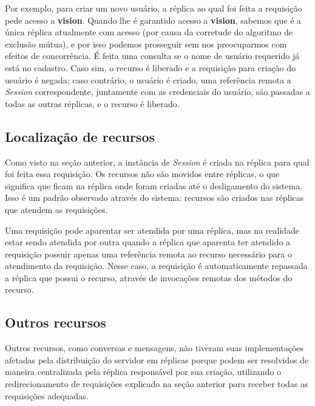 \documentclass[../main.tex]{subfiles}
\begin{document}
Por exemplo, para criar um novo usuário, a réplica ao qual foi feita a requisição pede acesso a \textbf{vision}.
Quando lhe é garantido acesso a \textbf{vision}, sabemos que é a única réplica atualmente com acesso (por causa da corretude do algoritmo de exclusão mútua), e por isso podemos prosseguir sem nos preocuparmos com efeitos de concorrência.
É feita uma consulta se o nome de usuário requerido já está no cadastro.
Caso sim, o recurso é liberado e a requisição para criação do usuário é negada; caso contrário, o usuário é criado, uma referência remota a \textit{Session} correspondente, juntamente com as credenciais do usuário, são passadas a todas as outras réplicas, e o recurso é liberado.

\subsection{Localização de recursos}

Como visto na seção anterior, a instância de \textit{Session} é criada na réplica para qual foi feita essa requisição.
Os recursos não são movidos entre réplicas, o que significa que ficam na réplica onde foram criadas até o desligamento do sistema.
Isso é um padrão observado através do sistema: recursos são criados nas réplicas que atendem as requisições.

Uma requisição pode aparentar ser atendida por uma réplica, mas na realidade estar sendo atendida por outra quando a réplica que aparenta ter atendido a requisição possuir apenas uma referência remota ao recurso necessário para o atendimento da requisição.
Nesse caso, a requisição é automaticamente repassada a réplica que possui o recurso, através de invocações remotas dos métodos do recurso.

\subsection{Outros recursos}

Outros recursos, como conversas e mensagens, não tiveram suas implementações afetadas pela distribuição do servidor em réplicas porque podem ser resolvidos de maneira centralizada pela réplica responsável por sua criação, utilizando o redirecionamento de requisições explicado na seção anterior para receber todas as requisições adequadas.
\end{document}
